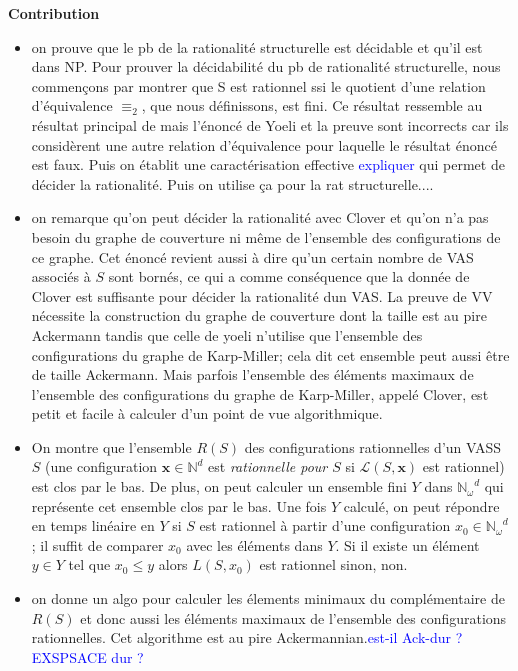 \documentclass[a4paper,final]{article}
\theoremstyle{definition}
\let\leq\leqslant
\newcommand{\alain}[1]{\textcolor{blue}{#1}}
\newcommand{\N}{\ensuremath{\mathbb{N}}}
\newcommand{\Nomega}{\ensuremath{\mathbb{N}_\omega}}
\newcommand{\lang}{\ensuremath{\mathcal{L}}}
\newcommand{\vect}[1]{\ensuremath{\mathbf{#1}}}
\begin{document}
{\bf Contribution}
\begin{itemize}
    \item on prouve que le pb de la rationalité structurelle est décidable et qu'il est dans NP. Pour prouver la décidabilité du pb de rationalité structurelle, nous commençons par montrer que S est rationnel ssi  le quotient d'une relation d'équivalence $\equiv_2$, que nous définissons, est fini. Ce résultat ressemble au résultat principal de \cite{giyo80} mais l'énoncé de Yoeli et la preuve sont incorrects car ils considèrent une autre relation d'équivalence pour laquelle le résultat énoncé est faux. Puis on établit une caractérisation effective \alain{expliquer} qui permet de décider la rationalité. Puis on utilise ça pour la rat structurelle....
    \item on remarque qu'on peut décider la rationalité avec Clover et qu'on n'a pas besoin du graphe de couverture ni même de l'ensemble des configurations de ce graphe. Cet énoncé revient aussi à dire qu'un certain nombre de VAS associés à $S$ sont bornés, ce qui a comme conséquence que la donnée de Clover est suffisante pour décider la rationalité dun VAS. La preuve de VV nécessite la construction du graphe de couverture dont la taille est au pire Ackermann tandis que celle de yoeli n'utilise que l'ensemble des configurations du graphe de Karp-Miller; cela dit cet ensemble peut aussi être de taille Ackermann. Mais parfois l'ensemble des éléments maximaux de l'ensemble des configurations du graphe de Karp-Miller, appelé Clover, est petit  et facile à calculer d'un point de vue algorithmique.  
    \item On montre que l'ensemble $R(S)$ des configurations rationnelles d'un VASS $S$ (une configuration $\vect{x} \in \N^d$ est \emph{rationnelle pour $S$} si $\lang(S,\vect{x})$ est rationnel) est clos par le bas. De plus, on peut calculer un ensemble fini $Y$ dans $\Nomega^d$ qui représente cet ensemble clos par le bas. Une fois $Y$ calculé, on peut répondre en temps linéaire en $Y$ si $S$ est rationnel à partir d'une configuration $x_0 \in \Nomega^d$; il suffit de comparer $x_0$ avec les éléments dans $Y$. Si il existe un élément $y \in Y$ tel que $x_0 \leq y$ alors $L(S,x_0)$ est rationnel sinon, non.
    \item on donne un algo pour calculer les élements minimaux du complémentaire de $R(S)$ et donc aussi les éléments maximaux de l'ensemble des configurations rationnelles. Cet algorithme est au pire Ackermannian.\alain{est-il Ack-dur ? EXSPSACE dur ?}

\end{itemize}
\end{document}
